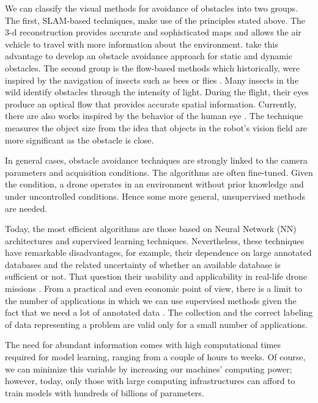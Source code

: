 We can classify the visual methods for avoidance of obstacles into two groups. The first, SLAM-based techniques, make use of the principles stated above. The 3-d reconstruction provides accurate and sophisticated maps and allows the air vehicle to travel with more information about the environment. \cite{Moreno-Armendariz.Calvo:ICMEAE:2014} take this advantage to develop an obstacle avoidance approach for static and dynamic obstacles. The second group is the flow-based methods which historically, were inspired by the navigation of insects such as bees \citep{Srinivasan.Gregory:PTBS:1992} or flies \citep{Franceschini.Ruffier.ea:InTech:2009}. Many insects in the wild identify obstacles through the intensity of light. During the flight, their eyes produce an optical flow that provides accurate spatial information. Currently, there are also works inspired by the behavior of the human eye \citep{Al-Kaff.Meng.ea:IVS:2016}. The technique measures the object size from the idea that objects in the robot's vision field are more significant as the obstacle is close.

In general cases, obstacle avoidance techniques are strongly linked to the camera parameters and acquisition conditions. The algorithms are often fine-tuned. Given the condition, a drone operates in an environment without prior knowledge and under uncontrolled conditions. Hence some more general, unsupervised methods are needed.

Today, the most efficient algorithms are those based on Neural Network (NN) architectures and supervised learning techniques. Nevertheless, these techniques have remarkable disadvantages, for example, their dependence on large annotated databases and the related uncertainty of whether an available database is sufficient or not. That question their usability and applicability in real-life drone missions \citep{Treboux.Genoud.ea:IWBIS:2018}. From a practical and even economic point of view, there is a limit to the number of applications in which we can use supervised methods given the fact that we need a lot of annotated data \citep{Xu.Wang.ea:CEA:2020}. The collection and the correct labeling of data representing a problem are valid only for a small number of applications.

The need for abundant information comes with high computational times required for model learning, ranging from a couple of hours to weeks. Of course, we can minimize this variable by increasing our machines' computing power; however, today, only those with large computing infrastructures can afford to train models with hundreds of billions of parameters.  

